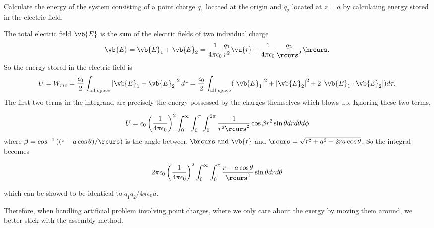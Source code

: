 \documentclass[english,a4paper,12pt]{report}
\begin{document}
{Calculate the energy of the system consisting of a point charge \(q_1\) located at the origin and \(q_2\) located at \( z=a \) by calculating energy stored in the electric field.}
{The total electric field \(\vb{E} \) is the sum of the electric fields of two individual charge
\begin{equation}
    \vb{E} = \vb{E} _{1} + \vb{E} _{2} = \frac{1}{4\pi\epsilon_0} \frac{q_1}{r^2} \vu{r} + \frac{1}{4\pi\epsilon_0} \frac{q_2}{\rcurs ^2} \hrcurs. 
\end{equation}
So the energy stored in the electric field is
\begin{equation}
    U = W_{me} = \frac{\epsilon_0}{2} \int _{\text{all space} } \left| \vb{E} _{1} + \vb{E} _{2}  \right| ^2 d\tau = \frac{\epsilon_0}{2} \int _{\text{all space} } (\left| \vb{E} _{1}  \right| ^2 + \left| \vb{E} _{2}  \right| ^2 + 2\left| \vb{E} _{1} \cdot \vb{E} _{2}  \right|) d\tau .
\end{equation}
The first two terms in the integrand are precisely the energy possessed by the charges themselves which blows up. Ignoring these two terms,

\begin{equation}
    U = \epsilon_0 \left(\frac{1}{4\pi\epsilon_0} \right)^2 \int_{0}^{\infty} \int_{0}^{\pi } \int_{0}^{2\pi }     \frac{1}{r^2\rcurs ^2} \cos \beta r^2\sin \theta drd\theta d\phi 
\end{equation}
where \(\beta = cos^{-1} \left((r-a \cos \theta ) /\rcurs\right)\) is the angle between \(\brcurs \text{ and } \vb{r}\) and \(\rcurs = \sqrt{r^2 + a^2 -2ra\cos \theta } \). So the integral becomes

\begin{equation}
    2\pi \epsilon_0 \left(\frac{1}{4\pi\epsilon_0} \right)^2 \int_{0}^{\infty} \int_{0}^{\pi } \frac{r-a \cos \theta }{\rcurs ^3} \sin \theta drd\theta  
\end{equation}

which can be showed to be identical to \( q_1 q_2 /4\pi \epsilon_0 a \).

Therefore, when handling artificial problem involving point charges, where we only care about the energy by moving them around, we better stick with the assembly method.} 
\end{document}
